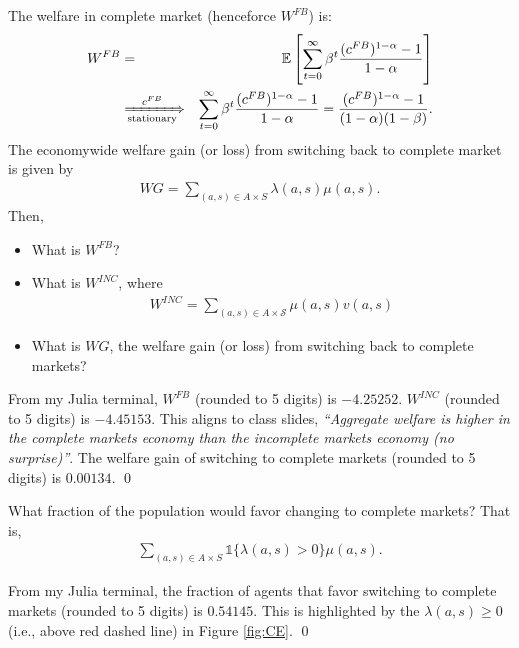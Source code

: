 \newpage
\begin{framedexercise} The welfare in complete market (henceforce $W^{FB}$) is:
    \begin{eqnarray}
        W^{FB} & = & \mathbb{E}\left[ \sum_{t=0}^\infty \beta^t
            \frac{(c^{FB})^{1-\alpha}-1}{1-\alpha} \right] \\
        & \xRightarrow[\text{\scriptsize stationary}]{\text{\scriptsize $c^{FB}$}} & \sum_{t=0}^\infty \beta^t
        \frac{(c^{FB})^{1-\alpha}-1}{1-\alpha} = \frac{(c^{FB})^{1-\alpha}-1}{(1-\alpha)(1-\beta)}.
    \end{eqnarray}
    The economywide welfare gain (or loss) from switching back to complete market is  given by
    \begin{eqnarray}
        WG = \sum_{(a,s) \in A \times S} \lambda(a,s)\mu(a,s).
    \end{eqnarray} Then, \begin{itemize}
        \item[\circled{1}] What is $W^{FB}$?
        \item[\circled{2}] What is $W^{INC}$, where
              \begin{eqnarray}
                  W^{INC} = \sum_{(a,s) \in A \times \mathcal{S}} \mu(a,s) v(a,s)
              \end{eqnarray}
        \item[\circled{3}] What is $WG$, the welfare gain (or loss) from switching back to complete markets?
    \end{itemize}
\end{framedexercise}

\begin{solution}
    From my Julia terminal, $W^{FB}$ (rounded to 5 digits) is $-4.25252$.
    $W^{INC}$ (rounded to 5 digits) is $-4.45153$. This aligns to class slides,
    \textit{``Aggregate welfare is higher in the complete markets economy than
        the incomplete markets economy (no surprise)''}.
    The welfare gain of switching to complete markets (rounded to 5 digits) is $0.00134$. \qed
\end{solution}

\begin{framedexercise} What fraction of the population would favor changing to complete markets?
    That is, \begin{eqnarray}
        \sum_{(a,s) \in A \times S} \mathbb{1}\{\lambda(a,s) > 0\} \mu(a,s).
    \end{eqnarray}
\end{framedexercise}

\begin{solution}
    From my Julia terminal, the fraction of agents that favor switching
    to complete markets (rounded to 5 digits) is $0.54145$.
    This is highlighted by the $\lambda(a,s) \geq 0$ (i.e., above red dashed line) in Figure \ref{fig:CE}. \qed
\end{solution}